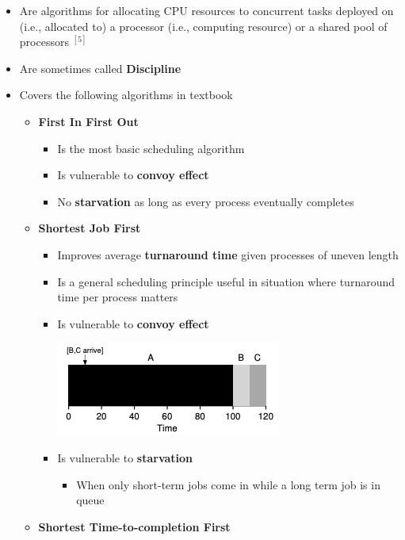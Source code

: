 \documentclass[12pt]{article}
\begin{document}
\begin{itemize}
    \item Are algorithms for allocating CPU resources to concurrent tasks
    deployed on (i.e., allocated to) a processor (i.e., computing resource)
    or a shared pool of processors $^{[5]}$
    \item Are sometimes called \textbf{Discipline}
    \item Covers the following algorithms in textbook

    \begin{itemize}
        \item \textbf{First In First Out}

        \begin{itemize}
            \item Is the most basic scheduling algorithm
            \item Is vulnerable to \textbf{convoy effect}
            \item No \textbf{starvation} as long as every process eventually completes
        \end{itemize}

        \item \textbf{Shortest Job First}

        \begin{itemize}
            \item Improves average \textbf{turnaround time} given processes of uneven length
            \item Is a general scheduling principle useful in situation where turnaround time
            per process matters
            \item Is vulnerable to \textbf{convoy effect}

            \begin{center}
            \includegraphics[width=0.7\linewidth]{images/midterm_2_solution_6.png}
            \end{center}

            \item Is vulnerable to \textbf{starvation}
            \begin{itemize}
                \item When only short-term jobs come in while a long term job is in queue
            \end{itemize}
        \end{itemize}
        \item \textbf{Shortest Time-to-completion First}


\end{itemize}
\end{itemize}
\end{document}
